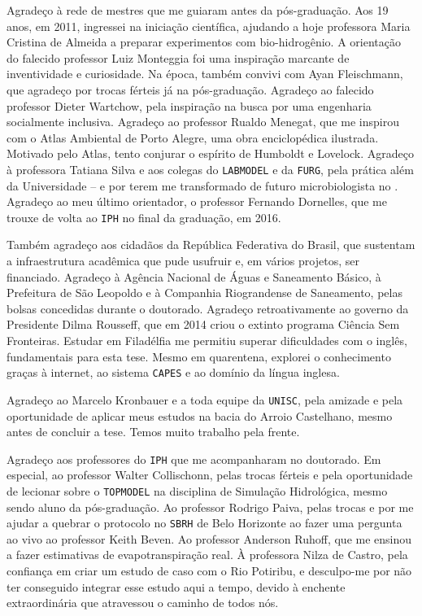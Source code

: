 \documentclass[./main.tex]{subfiles}
\begin{document}
\par Agradeço à rede de mestres que me guiaram antes da pós-graduação. Aos 19 anos, em 2011, ingressei na iniciação científica, ajudando a hoje professora Maria Cristina de Almeida a preparar experimentos com bio-hidrogênio. A orientação do falecido professor Luiz Monteggia foi uma inspiração marcante de inventividade e curiosidade. Na época, também convivi com Ayan Fleischmann, que agradeço por trocas férteis já na pós-graduação. Agradeço ao falecido professor Dieter Wartchow, pela inspiração na busca por uma engenharia socialmente inclusiva. Agradeço ao professor Rualdo Menegat, que me inspirou com o Atlas Ambiental de Porto Alegre, uma obra enciclopédica ilustrada. Motivado pelo Atlas, tento conjurar o espírito de Humboldt e Lovelock. Agradeço à professora Tatiana Silva e aos colegas do \texttt{LABMODEL} e da \texttt{FURG}, pela prática além da Universidade -- e por terem me transformado de futuro microbiologista no . Agradeço ao meu último orientador, o professor Fernando Dornelles, que me trouxe de volta ao \texttt{IPH} no final da graduação, em 2016.

\par Também agradeço aos cidadãos da República Federativa do Brasil, que sustentam a infraestrutura acadêmica que pude usufruir e, em vários projetos, ser financiado. Agradeço à Agência Nacional de Águas e Saneamento Básico, à Prefeitura de São Leopoldo e à Companhia Riograndense de Saneamento, pelas bolsas concedidas durante o doutorado. Agradeço retroativamente ao governo da Presidente Dilma Rousseff, que em 2014 criou o extinto programa Ciência Sem Fronteiras. Estudar em Filadélfia me permitiu superar dificuldades com o inglês, fundamentais para esta tese. Mesmo em quarentena, explorei o conhecimento graças à internet, ao sistema \texttt{CAPES} e ao domínio da língua inglesa.

\par Agradeço ao Marcelo Kronbauer e a toda equipe da \texttt{UNISC}, pela amizade e pela oportunidade de aplicar meus estudos na bacia do Arroio Castelhano, mesmo antes de concluir a tese. Temos muito trabalho pela frente.

\par Agradeço aos professores do \texttt{IPH} que me acompanharam no doutorado. Em especial, ao professor Walter Collischonn, pelas trocas férteis e pela oportunidade de lecionar sobre o \texttt{TOPMODEL} na disciplina de Simulação Hidrológica, mesmo sendo aluno da pós-graduação. Ao professor Rodrigo Paiva, pelas trocas e por me ajudar a quebrar o protocolo no \texttt{SBRH} de Belo Horizonte ao fazer uma pergunta ao vivo ao professor Keith Beven. Ao professor Anderson Ruhoff, que me ensinou a fazer estimativas de evapotranspiração real. À professora Nilza de Castro, pela confiança em criar um estudo de caso com o Rio Potiribu, e desculpo-me por não ter conseguido integrar esse estudo aqui a tempo, devido à enchente extraordinária que atravessou o caminho de todos nós.
\end{document}
